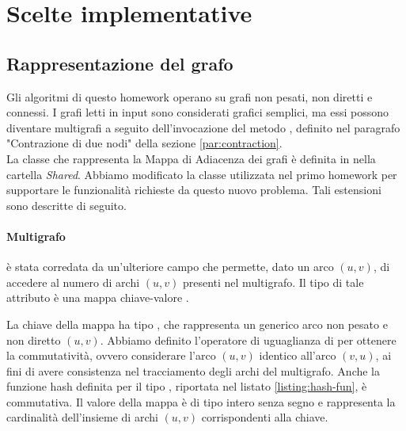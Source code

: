 \section{Scelte implementative}
\label{cap:implementation-choices}

\subsection{Rappresentazione del grafo}
\label{sub:graph-representation}

Gli algoritmi di questo homework operano su grafi non pesati,
 non diretti e connessi. I grafi letti in input sono considerati grafici semplici, ma essi possono diventare multigrafi a seguito dell'invocazione del metodo , definito nel paragrafo "Contrazione di due nodi" della sezione \ref{par:contraction}. \\


\noindent La classe che rappresenta la Mappa di Adiacenza dei grafi è
definita in  nella cartella
\textit{Shared}. Abbiamo modificato la classe utilizzata nel primo homework per supportare le funzionalità richieste da questo nuovo problema. Tali estensioni sono descritte di seguito.

\paragraph{Multigrafo}
 è stata corredata da un'ulteriore
campo  che permette, dato un arco $(u,v)$, di
accedere al numero di archi $(u,v)$ presenti nel multigrafo. Il tipo di tale attributo è una mappa chiave-valore .

\noindent La chiave della mappa ha tipo , che rappresenta un generico arco non pesato e non diretto $(u,v)$. Abbiamo definito l'operatore di uguaglianza di  per ottenere la commutatività, ovvero considerare l'arco $(u, v)$ identico all'arco $(v, u)$, ai fini di avere consistenza nel tracciamento degli archi del multigrafo. Anche la funzione hash definita per il tipo , riportata nel listato  \ref{listing:hash-fun}, è commutativa.
\noindent Il valore della mappa è di tipo intero senza segno  e rappresenta la cardinalità dell'insieme di archi $(u,v)$ corrispondenti alla chiave. \\

